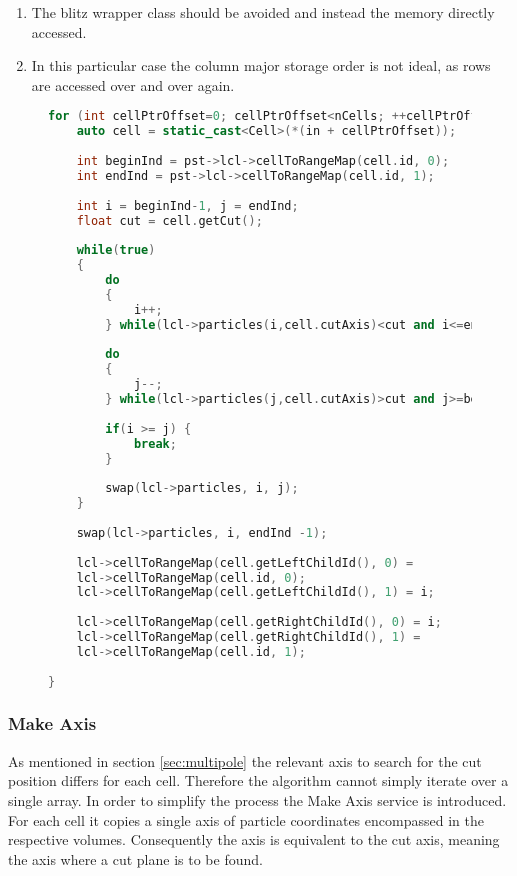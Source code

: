 \documentclass[]{article}
\begin{document}
\begin{enumerate}
	\item The blitz wrapper class should be avoided and instead the memory directly accessed.
	\item In this particular case the column major storage order is not ideal, as rows are accessed over and over again.
\end{enumerate}

\begin{figure}[H] 
	\begin{lstlisting}[language=c++, caption=Partition Service, label=partition]
for (int cellPtrOffset=0; cellPtrOffset<nCells; ++cellPtrOffset){
	auto cell = static_cast<Cell>(*(in + cellPtrOffset));
	
	int beginInd = pst->lcl->cellToRangeMap(cell.id, 0);
	int endInd = pst->lcl->cellToRangeMap(cell.id, 1);
	
	int i = beginInd-1, j = endInd;
	float cut = cell.getCut();
	
	while(true)
	{
		do
		{
			i++;
		} while(lcl->particles(i,cell.cutAxis)<cut and i<=endInd);
		
		do
		{
			j--;
		} while(lcl->particles(j,cell.cutAxis)>cut and j>=beginInd);
		
		if(i >= j) {
			break;
		}
		
		swap(lcl->particles, i, j);
	}
	
	swap(lcl->particles, i, endInd -1);
	
	lcl->cellToRangeMap(cell.getLeftChildId(), 0) =
	lcl->cellToRangeMap(cell.id, 0);
	lcl->cellToRangeMap(cell.getLeftChildId(), 1) = i;
	
	lcl->cellToRangeMap(cell.getRightChildId(), 0) = i;
	lcl->cellToRangeMap(cell.getRightChildId(), 1) =
	lcl->cellToRangeMap(cell.id, 1);
	
}
	\end{lstlisting}
\end{figure}


\subsubsection{Make Axis}

As mentioned in section \ref{sec:multipole} the relevant axis to search for the cut position differs for each cell. Therefore the algorithm cannot simply iterate over a single array. In order to simplify the process the Make Axis service is introduced. For each cell it copies a single axis of particle coordinates encompassed in the respective volumes. Consequently the axis is equivalent to the cut axis, meaning the axis where a cut plane is to be found. 
\end{document}
